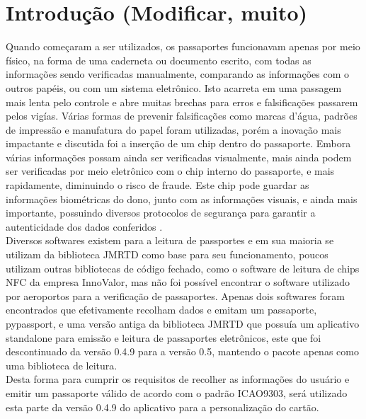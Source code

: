 \documentclass{article}
\begin{document}
	\section{Introdução (Modificar, muito)}
		\begin{justify}
			
			\hspace{2cm} Quando começaram a ser utilizados, os passaportes funcionavam apenas por meio físico, na forma de uma caderneta ou documento escrito, com todas as informações sendo verificadas manualmente, comparando as informações com o outros papéis, ou com um sistema eletrônico. Isto acarreta em uma passagem mais lenta pelo controle e abre muitas brechas para erros e falsificações passarem pelos vigías. Várias formas de prevenir falsificações como marcas d’água, padrões de impressão e manufatura do papel foram utilizadas, porém a inovação mais impactante e discutida foi a inserção de um chip dentro do passaporte. Embora várias informações possam ainda ser verificadas visualmente, mais ainda podem ser verificadas por meio eletrônico com o chip interno do passaporte, e mais rapidamente, diminuindo o risco de fraude. Este chip pode guardar as informações biométricas do dono, junto com as informações visuais, e ainda mais importante, possuindo diversos protocolos de segurança para garantir a autenticidade dos dados conferidos \cite{HOWPASSPORT}\cite{PASSPORTWIKI}.\\
			\hspace*{2cm} Diversos softwares existem para a leitura de passportes e em sua maioria se utilizam da biblioteca JMRTD\cite{JMRTD} como base para seu funcionamento, poucos utilizam outras bibliotecas de código fechado, como o software de leitura de chips NFC da empresa InnoValor\cite{INNOVALOR}, mas não foi possível encontrar o software utilizado por aeroportos para a verificação de passaportes. Apenas dois softwares foram encontrados que efetivamente recolham dados e emitam um passaporte, pypassport\cite{PYPASSPORT}, e uma versão antiga da biblioteca JMRTD que possuía um aplicativo standalone para emissão e leitura de passaportes eletrônicos, este que foi descontinuado da versão 0.4.9 para a versão 0.5, mantendo o pacote apenas como uma biblioteca de leitura. \\
			\hspace*{2cm} Desta forma para cumprir os requisitos de recolher as informações do usuário e emitir um passaporte válido de acordo com o padrão ICAO9303, será utilizado esta parte da versão 0.4.9 do aplicativo para a personalização do cartão.

			
		\end{justify}
\end{document}
